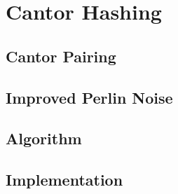 \section{Cantor Hashing}
\subsection{Cantor Pairing}

\subsection{Improved Perlin Noise}

\subsection{Algorithm}

\subsection{Implementation}


